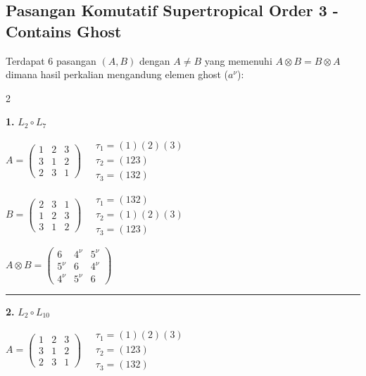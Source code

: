 
\subsection*{Pasangan Komutatif Supertropical Order 3 - Contains Ghost}

Terdapat 6 pasangan $(A, B)$ dengan $A \neq B$ yang memenuhi $A \otimes B = B \otimes A$
dimana hasil perkalian mengandung elemen ghost ($a^\nu$):

\begin{multicols}{2}
\small

\noindent\textbf{1.} $L_{2} \circ L_{7}$

$A = \begin{pmatrix} 1 & 2 & 3 \\ 3 & 1 & 2 \\ 2 & 3 & 1 \end{pmatrix} \quad \begin{matrix} \tau_{1}=(1)(2)(3) \\ \tau_{2}=(1 2 3) \\ \tau_{3}=(1 3 2) \end{matrix}$

$B = \begin{pmatrix} 2 & 3 & 1 \\ 1 & 2 & 3 \\ 3 & 1 & 2 \end{pmatrix} \quad \begin{matrix} \tau_{1}=(1 3 2) \\ \tau_{2}=(1)(2)(3) \\ \tau_{3}=(1 2 3) \end{matrix}$

$A \otimes B = \begin{pmatrix} 6 & 4^\nu & 5^\nu \\ 5^\nu & 6 & 4^\nu \\ 4^\nu & 5^\nu & 6 \end{pmatrix}$

\vspace{0.3em}
\hrule
\vspace{0.3em}

\noindent\textbf{2.} $L_{2} \circ L_{10}$

$A = \begin{pmatrix} 1 & 2 & 3 \\ 3 & 1 & 2 \\ 2 & 3 & 1 \end{pmatrix} \quad \begin{matrix} \tau_{1}=(1)(2)(3) \\ \tau_{2}=(1 2 3) \\ \tau_{3}=(1 3 2) \end{matrix}$


\end{multicols}
